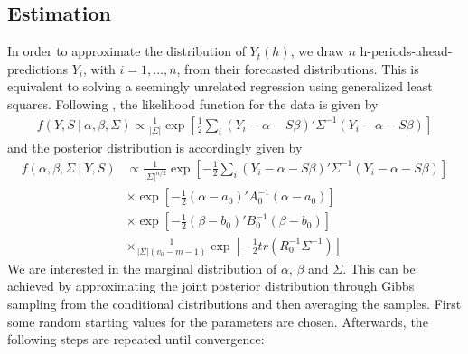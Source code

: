 \documentclass[a4paper,fleqn,11pt]{article}
\begin{document}
\subsection{Estimation}
In order to approximate the distribution of $Y_t(h)$, we draw $n$ h-periods-ahead-predictions $Y_i$, with $i = 1, \hdots, n$, from their forecasted distributions. This is equivalent to solving a seemingly unrelated regression using generalized least squares. Following \cite{Greenberg2008}, the likelihood function for the data is given by 
\begin{align*}
f(Y,S\ |\ \alpha,\beta,\Sigma) \propto \frac{1}{|\Sigma|}\exp\left[\frac{1}{2} \sum_i (Y_i - \alpha - S\beta)'\Sigma^{-1}(Y_i - \alpha - S\beta)\right]
\end{align*}
and the posterior distribution is accordingly given by
\begin{align*}
f(\alpha,\beta,\Sigma\ |\ Y,S) & \propto \frac{1}{|\Sigma|^{n/2}}\exp\left[-\frac{1}{2} \sum_i (Y_i - \alpha - S\beta)'\Sigma^{-1}(Y_i - \alpha - S\beta)\right] \\
&\times \exp \left[-\frac{1}{2}(\alpha - a_0)'A_0^{-1}(\alpha - a_0)\right] \\
&\times \exp \left[-\frac{1}{2}(\beta - b_0)'B_0^{-1}(\beta - b_0)\right] \\
&\times \frac{1}{|\Sigma|(v_0 - m - 1)} \exp \left[-\frac{1}{2} tr(R_0^{-1}\Sigma^{-1}) \right]
\end{align*}
We are interested in the marginal distribution of $\alpha$, $\beta$ and $\Sigma$. This can be achieved by approximating the joint posterior distribution through Gibbs sampling from the conditional distributions and then averaging the samples. First some random starting values for the parameters are chosen. Afterwards, the following steps are repeated until convergence:
\end{document}
